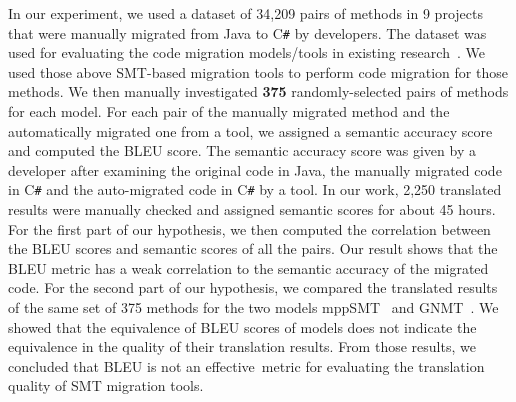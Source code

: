 In our experiment, we used a dataset of 34,209 pairs of methods in 9
projects that were manually migrated from Java to C\texttt{\#} by
developers. The dataset was used for evaluating the code migration
models/tools in existing research~\cite{ase15}. We used those above
SMT-based migration tools to perform code migration for those
methods. We then manually investigated {\bf 375} randomly-selected
pairs of methods for each model. For each pair of the manually
migrated method and the automatically migrated one from a tool, we
assigned a semantic accuracy score and computed the BLEU score. The
semantic accuracy score was given by a developer after examining the
original code in Java, the manually migrated code in C\texttt{\#} and
the auto-migrated code in C\texttt{\#} by a tool. In our work, 2,250
translated results were manually checked and assigned semantic scores 
for about 45 hours. For the first part of our hypothesis, we then computed 
the correlation between the BLEU scores and semantic scores of all the pairs. 
Our result shows that the BLEU metric has a weak correlation to the semantic 
accuracy of the migrated code. For the second part of our hypothesis, 
we compared the translated results of the same set of 375 methods for 
the two models mppSMT~\cite{ase15} and GNMT~\cite{gnmt}.
%
We showed that the equivalence of BLEU scores of models does not indicate 
the equivalence in the quality of their translation results.
From those results, we concluded that BLEU is not an effective~metric
for evaluating the translation quality of SMT migration tools.


